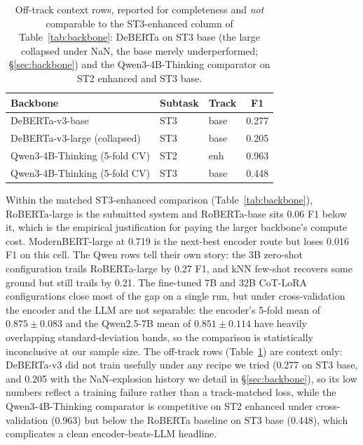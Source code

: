 \begin{table}[h]
\centering
\small
\caption{Off-track context rows, reported for completeness and \emph{not}
comparable to the ST3-enhanced column of Table~\ref{tab:backbone}: DeBERTa on
ST3 base (the large collapsed under NaN, the base merely underperformed;
\S\ref{sec:backbone}) and the Qwen3-4B-Thinking comparator on ST2 enhanced and
ST3 base.}
\label{tab:backbone-other}
\begin{tabular}{lllc}
\toprule
Backbone & Subtask & Track & F1 \\
\midrule
DeBERTa-v3-base                & ST3 & base & 0.277 \\ %
DeBERTa-v3-large (collapsed)   & ST3 & base & 0.205 \\ %
Qwen3-4B-Thinking (5-fold CV)  & ST2 & enh  & 0.963 \\ %
Qwen3-4B-Thinking (5-fold CV)  & ST3 & base & 0.448 \\ %
\bottomrule
\end{tabular}
\end{table}

Within the matched ST3-enhanced comparison (Table~\ref{tab:backbone}), RoBERTa-large is the submitted system and RoBERTa-base sits 0.06 F1 below it, which is the empirical justification for paying the larger backbone's compute cost. ModernBERT-large at 0.719 is the next-best encoder route but loses 0.016 F1 on this cell. The Qwen rows tell their own story: the 3B zero-shot configuration trails RoBERTa-large by 0.27 F1, and kNN few-shot recovers some ground but still trails by 0.21. The fine-tuned 7B and 32B CoT-LoRA configurations close most of the gap on a single run, but under cross-validation the encoder and the LLM are not separable: the encoder's 5-fold mean of $0.875 \pm 0.083$ and the Qwen2.5-7B mean of $0.851 \pm 0.114$ have heavily overlapping standard-deviation bands, so the comparison is statistically inconclusive at our sample size. The off-track rows (Table~\ref{tab:backbone-other}) are context only: DeBERTa-v3 did not train usefully under any recipe we tried (0.277 on ST3 base, and 0.205 with the NaN-explosion history we detail in \S\ref{sec:backbone}), so its low numbers reflect a training failure rather than a track-matched loss, while the Qwen3-4B-Thinking comparator is competitive on ST2 enhanced under cross-validation (0.963) but below the RoBERTa baseline on ST3 base (0.448), which complicates a clean encoder-beats-LLM headline.

